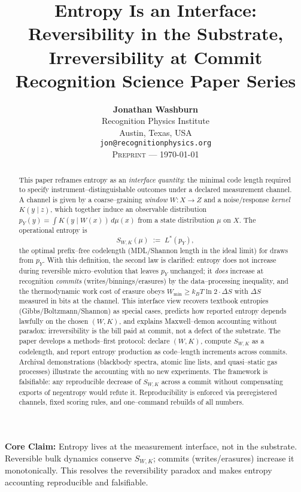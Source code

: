 \documentclass[11pt,letterpaper]{article}
\title{%
  \vspace{-1cm}%
  \Large\textbf{Entropy Is an Interface:}\\[0.3em]
  \large Reversibility in the Substrate, Irreversibility at Commit\\[1em]
  \normalsize Recognition Science Paper Series
}
\author{
  \textbf{Jonathan Washburn}\\
  Recognition Physics Institute\\
  Austin, Texas, USA\\
  \texttt{jon@recognitionphysics.org}\\[0.5em]
  \textsc{Preprint} --- \today
}
\date{}
\theoremstyle{definition}
\theoremstyle{remark}
\begin{document}
\maketitle

\begin{abstract}
\noindent This paper reframes entropy as an \emph{interface quantity}: the minimal code length required to specify instrument--distinguishable outcomes under a declared measurement channel. A channel is given by a coarse--graining \emph{window} \(W\!:\!X\!\to\!Z\) and a noise/response \emph{kernel} \(K(y\mid z)\), which together induce an observable distribution \(p_Y(y)=\int K(y\mid W(x))\,d\mu(x)\) from a state distribution \(\mu\) on \(X\). The operational entropy is
\[
S_{W,K}(\mu)\;:=\;L^\ast(p_Y),
\]
the optimal prefix--free codelength (MDL/Shannon length in the ideal limit) for draws from \(p_Y\). With this definition, the second law is clarified: entropy does not increase during reversible micro--evolution that leaves \(p_Y\) unchanged; it \emph{does} increase at recognition \emph{commits} (writes/binnings/erasures) by the data--processing inequality, and the thermodynamic work cost of erasure obeys \(W_{\min}\ge k_BT\ln 2\cdot\Delta S\) with \(\Delta S\) measured in bits at the channel. This interface view recovers textbook entropies (Gibbs/Boltzmann/Shannon) as special cases, predicts how reported entropy depends lawfully on the chosen \((W,K)\), and explains Maxwell--demon accounting without paradox: irreversibility is the bill paid at commit, not a defect of the substrate. The paper develops a methods--first protocol: declare \((W,K)\), compute \(S_{W,K}\) as a codelength, and report entropy production as code--length increments across commits. Archival demonstrations (blackbody spectra, atomic line lists, and quasi--static gas processes) illustrate the accounting with no new experiments. The framework is falsifiable: any reproducible decrease of \(S_{W,K}\) across a commit without compensating exports of negentropy would refute it. Reproducibility is enforced via preregistered channels, fixed scoring rules, and one--command rebuilds of all numbers.
\end{abstract}

\vspace{1em}

\begin{keypoint}
\textbf{Core Claim:} Entropy lives at the measurement interface, not in the substrate. Reversible bulk dynamics conserve \(S_{W,K}\); commits (writes/erasures) increase it monotonically. This resolves the reversibility paradox and makes entropy accounting reproducible and falsifiable.
\end{keypoint}
\end{document}
